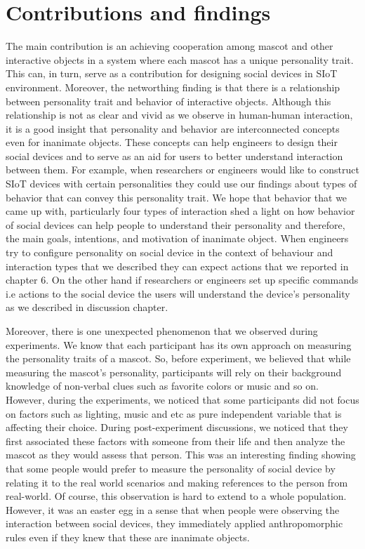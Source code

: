 \section{Contributions and findings}
The main contribution is an achieving cooperation among mascot and other interactive objects in a system where each mascot has a unique personality trait. This can, in turn, serve as a contribution for designing social devices in SIoT environment. Moreover, the networthing finding is that there is a relationship between personality trait and behavior of interactive objects. Although this relationship is not as clear and vivid as we observe in human-human interaction, it is a good insight that personality and behavior are interconnected concepts even for inanimate objects. These concepts can help engineers to design their social devices and to serve as an aid for users to better understand interaction between them. For example, when researchers or engineers would like to construct SIoT devices with certain personalities they could use our findings about types of behavior that can convey this personality trait. We hope that behavior that we came up with, particularly four types of interaction shed a light on how behavior of social devices can help people to understand their personality and therefore, the main goals, intentions, and motivation of inanimate object. When engineers try to configure personality on social device in the context of behaviour and interaction types that we described they can expect actions that we reported in chapter 6. On the other hand if researchers or engineers set up specific commands i.e actions to the social device the users will understand the device's personality as we described in discussion chapter.
\par Moreover, there is one unexpected phenomenon that we observed during experiments. We know that each participant has its own approach on measuring the personality traits of a mascot. So, before experiment, we believed that while measuring the mascot’s personality, participants will rely on their background knowledge of non-verbal clues such as favorite colors or music and so on. However, during the experiments, we noticed that some participants did not focus on factors such as lighting, music and etc as pure independent variable that is affecting their choice. During post-experiment discussions, we noticed that they first associated these factors with someone from their life and then analyze the mascot as they would assess that person. This was an interesting finding showing that some people would prefer to measure the personality of social device by relating it to the real world scenarios and making references to the person from real-world. Of course, this observation is hard to extend to a whole population. However, it was an easter egg in a sense that when people were observing the interaction between social devices, they immediately applied anthropomorphic rules even if they knew that these are inanimate objects.
